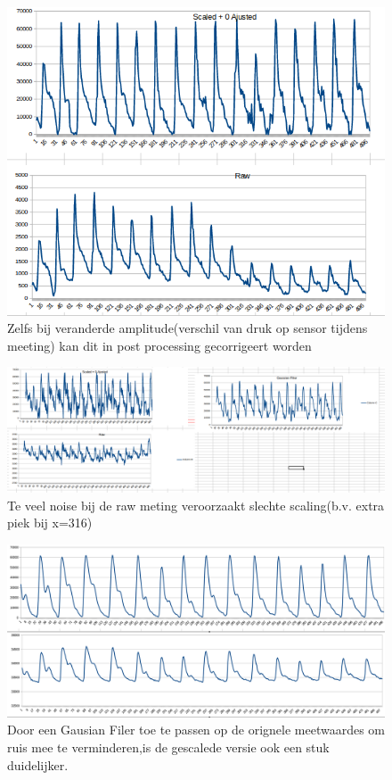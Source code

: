 \documentclass[11pt]{article}
\begin{document}
\begin{figure}
	\caption{Zelfs bij veranderde amplitude(verschil van druk op sensor tijdens meeting) kan dit in post processing gecorrigeert worden}
	\centering
    \includegraphics[height=0.7\textheight]{Images/r6.png}
\end{figure}

\begin{figure}
	\caption{Te veel noise bij de raw meting veroorzaakt slechte scaling(b.v. extra piek bij x=316)}
	\centering
    \includegraphics[height=0.7\textheight]{Images/r3.png}
\end{figure}



\begin{figure}
	\caption{Door een Gausian Filer toe te passen op de orignele meetwaardes om ruis mee te verminderen,is de gescalede versie ook een stuk duidelijker.}
	\centering
    \includegraphics[height=0.4\textheight]{Images/r5.png}
\end{figure}
\end{document}
